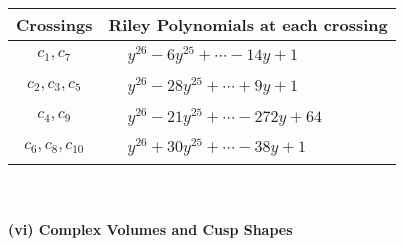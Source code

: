 \documentclass[1p]{elsarticle_modified}
\theoremstyle{definition}
\begin{document}
\begin{tabular}{m{50pt}|m{274pt}}
Crossings & \hspace{64pt}Riley Polynomials at each crossing \\
\hline $$\begin{aligned}c_{1},c_{7}\end{aligned}$$&$\begin{aligned}
&y^{26}-6 y^{25}+\cdots-14 y+1
\end{aligned}$\\
\hline $$\begin{aligned}c_{2},c_{3},c_{5}\end{aligned}$$&$\begin{aligned}
&y^{26}-28 y^{25}+\cdots+9 y+1
\end{aligned}$\\
\hline $$\begin{aligned}c_{4},c_{9}\end{aligned}$$&$\begin{aligned}
&y^{26}-21 y^{25}+\cdots-272 y+64
\end{aligned}$\\
\hline $$\begin{aligned}c_{6},c_{8},c_{10}\end{aligned}$$&$\begin{aligned}
&y^{26}+30 y^{25}+\cdots-38 y+1
\end{aligned}$\\
\hline
\end{tabular}\\~\\
\newpage\flushleft \textbf{(vi) Complex Volumes and Cusp Shapes}
\end{document}
